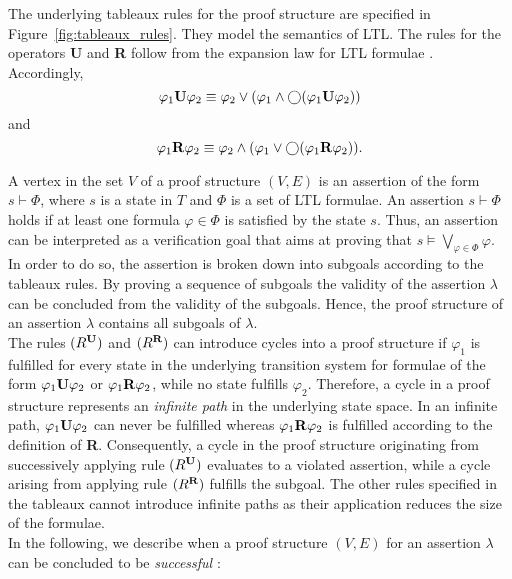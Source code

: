 \documentclass[a4paper, 12pt, twoside]{report}
\begin{document}
	The underlying tableaux rules for the proof structure are specified in Figure~\ref{fig:tableaux_rules}. They model the semantics of LTL. The rules for the operators \textbf{U} and \textbf{R} follow from the expansion law for LTL formulae \cite{baier2008principles}. Accordingly,
	\[\varphi_1 \text{\textbf{U}} \varphi_2 \equiv \varphi_2 \vee (\varphi_1 \wedge \bigcirc (\varphi_1 \text{\textbf{U}} \varphi_2))\] and
	\[\varphi_1 \text{\textbf{R}} \varphi_2 \equiv \varphi_2 \wedge (\varphi_1 \vee \bigcirc (\varphi_1 \text{\textbf{R}} \varphi_2)).\]	
	
	A vertex in the set $V$ of a proof structure $(V,E)$ is an assertion of the form $s \vdash \Phi$, where $s$ is a state in $T$ and $\Phi$ is a set of LTL formulae. An assertion $s \vdash \Phi$ holds if at least one formula $\varphi \in \Phi$ is satisfied by the state $s$. Thus, an assertion can be interpreted as a verification goal that aims at proving that $s\models \bigvee_{\varphi \in \Phi}\varphi$. In order to do so, the assertion is broken down into subgoals according to the tableaux rules. By proving a sequence of subgoals the validity of the assertion $\lambda$ can be concluded from the validity of the subgoals. Hence, the proof structure of an assertion $\lambda$ contains all subgoals of $\lambda$. \\
	
	The rules $(R^{\text{\textbf{U}}})$ and $(R^{\text{\textbf{R}}})$ can introduce cycles into a proof structure if $\varphi_1$ is fulfilled for every state in the underlying transition system for formulae of the form $\varphi_1 \text{\textbf{U}} \varphi_2$ or $\varphi_1 \text{\textbf{R}} \varphi_2$, while no state fulfills $\varphi_2$. Therefore, a cycle in a proof structure represents an \textit{infinite path} in the underlying state space. In an infinite path, $\varphi_1 \text{\textbf{U}} \varphi_2$ can never be fulfilled whereas $\varphi_1 \text{\textbf{R}} \varphi_2$ is fulfilled according to the definition of \textbf{R}. Consequently, a cycle in the proof structure originating from successively applying rule $(R^{\text{\textbf{U}}})$ evaluates to a violated assertion, while a cycle arising from applying rule $(R^{\text{\textbf{R}}})$ fulfills the subgoal. The other rules specified in the tableaux cannot introduce infinite paths as their application reduces the size of the formulae. \\
	
	In the following, we describe when a proof structure $(V,E)$ for an assertion $\lambda$ can be concluded to be \textit{successful} \cite{bhat1995efficient}:
	
\end{document}

